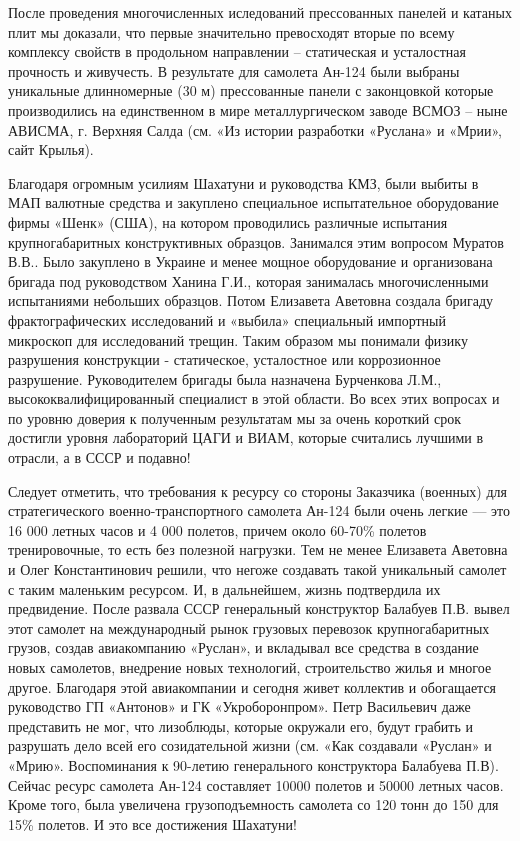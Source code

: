 После проведения многочисленных иследований прессованных панелей и катаных плит
мы доказали, что первые значительно превосходят вторые по всему комплексу
свойств в продольном направлении – статическая и усталостная прочность и
живучесть. В результате для самолета Ан-124 были выбраны уникальные
длинномерные (30 м) прессованные панели с законцовкой которые производились на
единственном в мире металлургическом заводе ВСМОЗ – ныне АВИСМА, г. Верхняя
Салда (см. «Из истории разработки «Руслана» и «Мрии», сайт Крылья).

Благодаря огромным усилиям Шахатуни и руководства КМЗ, были выбиты в МАП
валютные средства и закуплено специальное испытательное оборудование фирмы
«Шенк» (США), на котором проводились различные испытания крупногабаритных
конструктивных образцов. Занимался этим вопросом Муратов В.В.. Было закуплено в
Украине и менее мощное оборудование и организована бригада под руководством
Ханина Г.И., которая занималась многочисленными испытаниями небольших образцов.
Потом Елизавета Аветовна создала бригаду фрактографических исследований и
«выбила» специальный импортный микроскоп для исследований трещин. Таким образом
мы понимали физику разрушения конструкции - статическое, усталостное или
коррозионное разрушение. Руководителем бригады была назначена Бурченкова Л.М.,
высококвалифицированный специалист в этой области. Во всех этих вопросах и по
уровню доверия к полученным результатам мы за очень короткий срок достигли
уровня лабораторий ЦАГИ и ВИАМ, которые считались лучшими в отрасли, а в СССР и
подавно!

Следует отметить, что требования к ресурсу со стороны Заказчика (военных) для
стратегического военно-транспортного самолета Ан-124 были очень легкие — это 16
000 летных часов и 4 000 полетов, причем около 60-70\% полетов тренировочные, то
есть без полезной нагрузки. Тем не менее Елизавета Аветовна и Олег
Константинович решили, что негоже создавать такой уникальный самолет с таким
маленьким ресурсом. И, в дальнейшем, жизнь подтвердила их предвидение. После
развала СССР генеральный конструктор Балабуев П.В. вывел этот самолет на
международный рынок грузовых перевозок крупногабаритных грузов, создав
авиакомпанию «Руслан», и вкладывал все средства в создание новых самолетов,
внедрение новых технологий, строительство жилья и многое другое. Благодаря этой
авиакомпании и сегодня живет коллектив и обогащается руководство ГП «Антонов» и
ГК «Укроборонпром». Петр Васильевич даже представить не мог, что лизоблюды,
которые окружали его, будут грабить и разрушать дело всей его созидательной
жизни (см. «Как создавали «Руслан» и «Мрию». Воспоминания к 90-летию
генерального конструктора Балабуева П.В). Сейчас ресурс самолета Ан-124
составляет 10000 полетов и 50000 летных часов. Кроме того, была увеличена
грузоподъемность самолета со 120 тонн до 150 для 15\% полетов. И это все
достижения Шахатуни!

